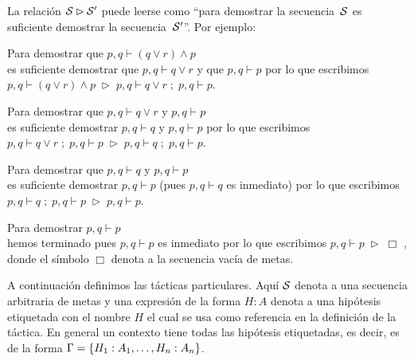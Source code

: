 \documentclass[11pt,letterpaper]{article}
\begin{document}
\item La relación $\mathcal{S}\rhd \mathcal{S}'$ puede leerse como \enquote{para demostrar la 
secuencia~$\mathcal{S}$ es suficiente demostrar la secuencia~$\mathcal{S}'$}. Por ejemplo:
\bi
 \item Para demostrar que $p,q\vdash (q\lor r) \land p$ \\
  es suficiente demostrar que $p,q\vdash q\lor r$  y que $p,q\vdash p$
  por lo que escribimos 
  $p,q\vdash (q\lor r) \land p\;\rhd\;p,q\vdash q\lor r\;; \;p,q\vdash p$.
  
 \item Para demostrar que $p,q\vdash q\lor r$ y $p,q\vdash p$ \\
  es suficiente demostrar $p,q\vdash q$  y $p,q\vdash p$
  por lo que escribimos 
  $p,q\vdash q\lor r\; ; \;p,q\vdash p\;\rhd\; p,q\vdash q\; ; \;p,q\vdash p$.

 \item Para demostrar que $p,q\vdash q$ y $p,q\vdash p$ \\
 es suficiente demostrar $p,q\vdash p$ (pues $p,q\vdash q$ es inmediato)
por lo que escribimos 
$p,q\vdash q\; ; \;p,q\vdash p\;\rhd\;p,q\vdash p$.

 \item Para demostrar $p,q\vdash p$ \\
  hemos terminado pues $p,q\vdash p$ es inmediato por lo que escribimos 
  $p,q\vdash p\;\rhd\; \Box$ ,  donde el símbolo $\Box$ denota a la secuencia vacía de metas.
\ei
\ei

A continuación definimos las tácticas particulares. Aquí $\mathcal{S}$ denota a una 
secuencia arbitraria de metas y una expresión de la forma $H:A$ denota a 
una hipótesis etiquetada con el nombre $H$ el cual se usa como referencia en la 
definición de la táctica. En general un contexto tiene todas las hipótesis 
etiquetadas, es decir, es de la forma $\Gamma=\{H_1:A_1,\ldots,H_n:A_n\}$.
\end{document}
